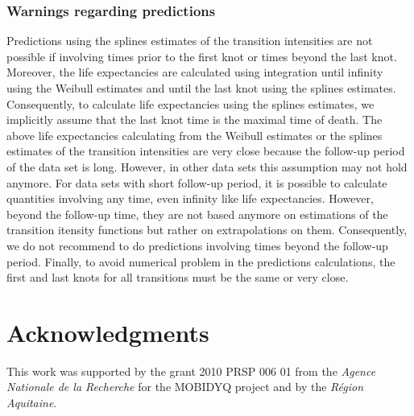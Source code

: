 \documentclass[article]{jss}
\begin{document}
\subsubsection{Warnings regarding predictions}
\label{sec-5-4-1}
\label{sec:warnings}    
Predictions using the splines estimates of the transition intensities
are not possible if involving times prior to the first knot or times
beyond the last knot.  Moreover, the life expectancies are calculated
using integration until infinity using the Weibull estimates and until
the last knot using the splines estimates.  Consequently, to calculate
life expectancies using the splines estimates, we implicitly assume
that the last knot time is the maximal time of death.  The above life
expectancies calculating from the Weibull estimates or the splines
estimates of the transition intensities are very close because the
follow-up period of the  data set is long.  However, in
other data sets this assumption may not hold anymore.  
For data sets with short follow-up period, it is possible 
to calculate quantities involving any time, even infinity like 
life expectancies. However, beyond the follow-up time, they are not 
based anymore
on estimations of the transition itensity functions but rather on 
extrapolations on them. Consequently, we do not recommend to do 
predictions involving times beyond the follow-up period.
Finally, to
avoid numerical problem in the predictions calculations, the first and
last knots  for all transitions must be the same or very close.

\section*{Acknowledgments}
This work was supported by the grant 2010 PRSP 006 01 from the \textit{Agence Nationale de la Recherche} 
for the MOBIDYQ project and by the \textit{Région Aquitaine}.


\end{document}
